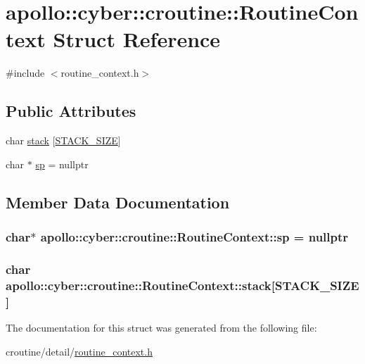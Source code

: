 \hypertarget{structapollo_1_1cyber_1_1croutine_1_1RoutineContext}{\section{apollo\-:\-:cyber\-:\-:croutine\-:\-:Routine\-Context Struct Reference}
\label{structapollo_1_1cyber_1_1croutine_1_1RoutineContext}
}


{\ttfamily \#include $<$routine\-\_\-context.\-h$>$}

\subsection*{Public Attributes}
\begin{DoxyCompactItemize}
\item 
char \hyperlink{structapollo_1_1cyber_1_1croutine_1_1RoutineContext_a009fae2d552bfa4362b9e3ba786b3dff}{stack} \mbox{[}\hyperlink{namespaceapollo_1_1cyber_1_1croutine_ac645ea6350d95f21980e311868f72557}{S\-T\-A\-C\-K\-\_\-\-S\-I\-Z\-E}\mbox{]}
\item 
char $\ast$ \hyperlink{structapollo_1_1cyber_1_1croutine_1_1RoutineContext_ac776668f065884295a7925836ddaac97}{sp} = nullptr
\end{DoxyCompactItemize}


\subsection{Member Data Documentation}
\hypertarget{structapollo_1_1cyber_1_1croutine_1_1RoutineContext_ac776668f065884295a7925836ddaac97}{
\subsubsection[{sp}]{\setlength{\rightskip}{0pt plus 5cm}char$\ast$ apollo\-::cyber\-::croutine\-::\-Routine\-Context\-::sp = nullptr}}\label{structapollo_1_1cyber_1_1croutine_1_1RoutineContext_ac776668f065884295a7925836ddaac97}
\hypertarget{structapollo_1_1cyber_1_1croutine_1_1RoutineContext_a009fae2d552bfa4362b9e3ba786b3dff}{
\subsubsection[{stack}]{\setlength{\rightskip}{0pt plus 5cm}char apollo\-::cyber\-::croutine\-::\-Routine\-Context\-::stack\mbox{[}{\bf S\-T\-A\-C\-K\-\_\-\-S\-I\-Z\-E}\mbox{]}}}\label{structapollo_1_1cyber_1_1croutine_1_1RoutineContext_a009fae2d552bfa4362b9e3ba786b3dff}


The documentation for this struct was generated from the following file\-:\begin{DoxyCompactItemize}
\item 
croutine/detail/\hyperlink{routine__context_8h}{routine\-\_\-context.\-h}\end{DoxyCompactItemize}
